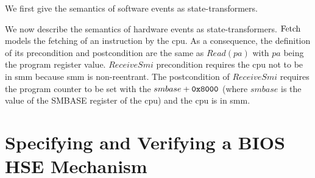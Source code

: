 We first give the semantics of software events as state-transformers.
%

We now describe the semantics of hardware events as state-transformers.
%
$\mathrm{Fetch}$ models the fetching of an instruction by the \ac{cpu}.
%
As a consequence, the definition of its precondition and postcondition are the
same as $Read(pa)$ with $pa$ being the program register value.
%
$ReceiveSmi$ precondition requires the \ac{cpu} not to be in \ac{smm} because
\ac{smm} is non-reentrant.
%
The postcondition of $ReceiveSmi$ requires the program counter to be set with
the $smbase + \mathtt{0x8000}$ (where $smbase$ is the value of the SMBASE register
of the \ac{cpu}) and the \ac{cpu} is in \ac{smm}.


\section{Specifying and Verifying a BIOS HSE Mechanism}
\label{sec:speccert2:verif}

